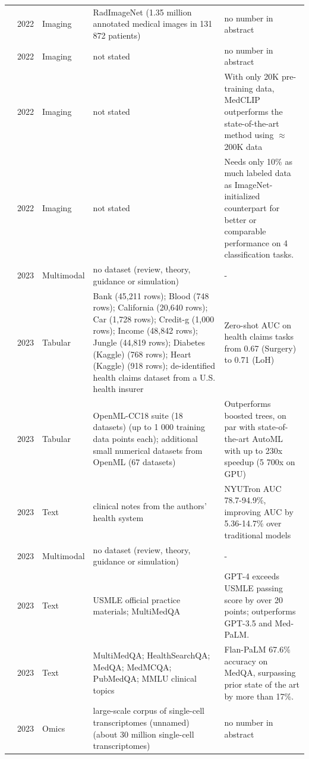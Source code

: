 \begin{longtable}{@{}p{2.6cm}p{0.7cm}p{1.2cm}p{4.4cm}p{4.6cm}@{}}
\cite{mei2022radimagenet} & 2022 & Imaging & RadImageNet (1.35 million annotated medical images in 131 872 patients) & no number in abstract\\
\cite{tiu2022expert} & 2022 & Imaging & not stated & no number in abstract\\
\cite{wang2022medclip} & 2022 & Imaging & not stated & With only 20K pre-training data, MedCLIP outperforms the state-of-the-art method using $\approx$200K data\\
\cite{zhang2022contrastive} & 2022 & Imaging & not stated & Needs only 10\% as much labeled data as ImageNet-initialized counterpart for better or comparable performance on 4 classification tasks.\\
\cite{banerjee2023machine} & 2023 & Multimodal & no dataset (review, theory, guidance or simulation) & -\\
\cite{hegselmann2023tabllm} & 2023 & Tabular & Bank (45,211 rows); Blood (748 rows); California (20,640 rows); Car (1,728 rows); Credit-g (1,000 rows); Income (48,842 rows); Jungle (44,819 rows); Diabetes (Kaggle) (768 rows); Heart (Kaggle) (918 rows); de-identified health claims dataset from a U.S. health insurer & Zero-shot AUC on health claims tasks from 0.67 (Surgery) to 0.71 (LoH)\\
\cite{hollmann2023tabpfn} & 2023 & Tabular & OpenML-CC18 suite (18 datasets) (up to 1 000 training data points each); additional small numerical datasets from OpenML (67 datasets) & Outperforms boosted trees, on par with state-of-the-art AutoML with up to 230x speedup (5 700x on GPU)\\
\cite{jiang2023health} & 2023 & Text & clinical notes from the authors' health system & NYUTron AUC 78.7-94.9\%, improving AUC by 5.36-14.7\% over traditional models\\
\cite{moor2023foundation} & 2023 & Multimodal & no dataset (review, theory, guidance or simulation) & -\\
\cite{nori2023capabilities} & 2023 & Text & USMLE official practice materials; MultiMedQA & GPT-4 exceeds USMLE passing score by over 20 points; outperforms GPT-3.5 and Med-PaLM.\\
\cite{singhal2023large} & 2023 & Text & MultiMedQA; HealthSearchQA; MedQA; MedMCQA; PubMedQA; MMLU clinical topics & Flan-PaLM 67.6\% accuracy on MedQA, surpassing prior state of the art by more than 17\%.\\
\cite{theodoris2023transfer} & 2023 & Omics & large-scale corpus of single-cell transcriptomes (unnamed) (about 30 million single-cell transcriptomes) & no number in abstract\\

\end{longtable}
